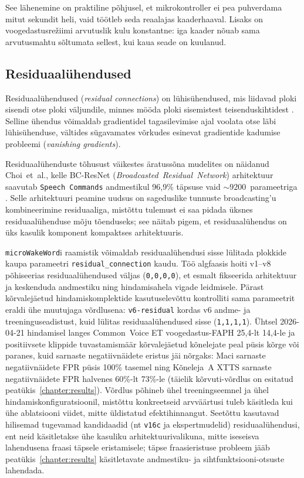 See lähenemine on praktiline põhjusel, et mikrokontroller ei pea puhverdama mitut sekundit heli, vaid töötleb seda reaalajas kaaderhaaval. Lisaks on voogedastusrežiimi arvutuslik kulu konstantne: iga kaader nõuab sama arvutusmahtu sõltumata sellest, kui kaua seade on kuulanud.

\subsection{Residuaalühendused}
\label{subsec:residual}

Residuaalühendused (\emph{residual connections}) on lühisühendused, mis liidavad ploki sisendi otse ploki väljundile, minnes mööda ploki sisemistest teisenduskihtidest \cite{he2016resnet}. Selline ühendus võimaldab gradientidel tagasilevimise ajal voolata otse läbi lühisühenduse, vältides sügavamates võrkudes esinevat gradientide kadumise probleemi (\emph{vanishing gradients}).

Residuaalühenduste tõhusust väikestes äratussõna mudelites on näidanud Choi~et~al., kelle BC-ResNet (\emph{Broadcasted~Residual~Network}) arhitektuur saavutab \texttt{Speech Commands} andmestikul 96,9\% täpsuse vaid ${\sim}9200$~parameetriga \cite{choi2021bcresnet}. Selle arhitektuuri peamine uudsus on sageduslike tunnuste broadcasting'u kombineerimine residuaaliga, mistõttu tulemust ei saa pidada üksnes residuaalühenduse mõju tõenduseks; see näitab pigem, et residuaalühendus on üks kasulik komponent kompaktses arhitektuuris.

\texttt{microWakeWord}i raamistik võimaldab residuaalühendusi sisse lülitada plokkide kaupa parameetri \texttt{residual\_connection} kaudu. Töö algfaasis hoiti v1--v8 põhiseerias residuaalühendused väljas (\texttt{0,0,0,0}), et esmalt fikseerida arhitektuur ja keskenduda andmestiku ning hindamisahela vigade leidmisele. Pärast kõrvalejäetud hindamiskomplektide kasutuselevõttu kontrolliti sama parameetrit eraldi ühe muutujaga võrdlusena: \texttt{v6-residual} kordas v6 andme- ja treeninguseadistust, kuid lülitas residuaalühendused sisse (\texttt{1,1,1,1}). Ühtsel 2026-04-21 hindamisel langes Common~Voice ET voogedastus-FAPH 25,4-lt 14,4-le ja positiivsete klippide tuvastamismäär kõrvalejäetud kõnelejate peal püsis kõrge või paranes, kuid sarnaste negatiivnäidete eristus jäi nõrgaks: Maci sarnaste negatiivnäidete FPR püsis 100\% tasemel ning Kõneleja~A XTTS sarnaste negatiivnäidete FPR halvenes 60\%-lt 73\%-le (täielik kõrvuti-võrdlus on esitatud peatükis~\ref{chapter:results}). Võrdlus põhineb ühel treeningseemnel ja ühel hindamiskonfiguratsioonil, mistõttu konkreetseid arvväärtusi tuleb käsitleda kui ühe ablatsiooni viidet, mitte üldistatud efektihinnangut. Seetõttu kasutavad hilisemad tugevamad kandidaadid (nt \texttt{v16c} ja ekspertmudelid) residuaalühendusi, ent neid käsitletakse ühe kasuliku arhitektuurivalikuna, mitte iseseisva lahendusena fraasi täpsele eristamisele; täpse fraasieristuse probleem jääb peatükis~\ref{chapter:results} käsitletavate andmestiku- ja sihtfunktsiooni-otsuste lahendada.

